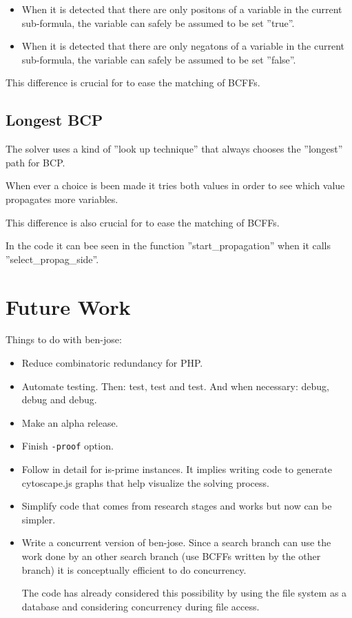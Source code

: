 \documentclass{easychair}
\begin{document}
\begin{itemize}
\item
When it is detected that there are only positons of a variable in the current sub-formula, the variable can safely be assumed to be set ''true''. 

\item
When it is detected that there are only negatons of a variable in the current sub-formula, the variable can safely be assumed to be set ''false''. 
\end{itemize}

This difference is crucial for to ease the matching of BCFFs.

\subsection{Longest BCP}

The solver uses a kind of ''look up technique'' that always chooses the ''longest'' path for BCP. 

When ever a choice is been made it tries both values in order to see which value propagates more variables. 

This difference is also crucial for to ease the matching of BCFFs.

In the code it can bee seen in the function ''start\_propagation'' when it calls ''select\_propag\_side''.

\section{Future Work}
\label{sect:future-work}

Things to do with ben-jose:

\begin{itemize}
\item
Reduce combinatoric redundancy for PHP.

\item
Automate testing. Then: test, test and test. And when necessary: debug, debug and debug.

\item
Make an alpha release.

\item
Finish \texttt{-proof} option.

\item
Follow in detail for is-prime instances. It implies writing code to generate cytoscape.js graphs that help visualize the solving process.

\item
Simplify code that comes from research stages and works but now can be simpler.

\item
Write a concurrent version of ben-jose. Since a search branch can use the work done by an other search branch (use BCFFs written by the other branch) it is conceptually efficient to do concurrency.

The code has already considered this possibility by using the file system as a database and considering concurrency during file access.

\end{itemize}
\end{document}
